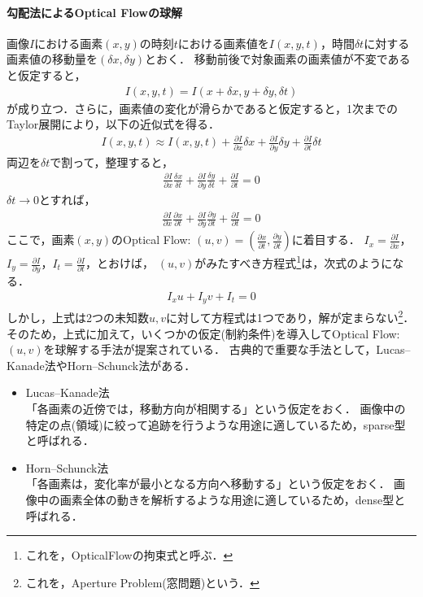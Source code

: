 \documentclass[11pt,a4j]{jarticle}
\begin{document}
      \paragraph{勾配法によるOptical Flowの球解}
      画像$I$における画素$(x,y)$の時刻$t$における画素値を$I(x,y,t)$，時間$\delta t$に対する画素値の移動量を$(\delta x, \delta y)$とおく．
      移動前後で対象画素の画素値が不変であると仮定すると，
      \begin{align}
        I(x,y,t) = I(x + \delta x, y + \delta y, \delta t)
      \end{align}
      が成り立つ．さらに，画素値の変化が滑らかであると仮定すると，1次までのTaylor展開により，以下の近似式を得る．
      \begin{align}
        I(x,y,t) \approx I(x,y,t) + \frac{\partial I}{\partial x} \delta x + \frac{\partial I}{\partial y} \delta y + \frac{\partial I}{\partial t} \delta t
      \end{align}
      両辺を$\delta t$で割って，整理すると，
      \begin{align}
        \frac{\partial I}{\partial x} \frac{\delta x}{\delta t} + \frac{\partial I}{\partial y} \frac{\delta y}{\delta t} + \frac{\partial I}{\partial t} = 0
      \end{align}
      $\delta t \to 0$とすれば，
      \begin{align}
        \frac{\partial I}{\partial x} \frac{\partial x}{\partial t} + \frac{\partial I}{\partial y} \frac{\partial y}{\partial t} + \frac{\partial I}{\partial t} = 0
      \end{align}
      ここで，画素$(x,y)$のOptical Flow: $(u,v) = \left(\frac{\partial x}{\partial t}, \frac{\partial y}{\partial t} \right)$に着目する．
      $I_x = \frac{\partial I}{\partial x}$，$I_y = \frac{\partial I}{\partial y}$，$I_t = \frac{\partial I}{\partial t}$，とおけば，
      $(u,v)$がみたすべき方程式\footnote{これを，OpticalFlowの拘束式と呼ぶ．}は，次式のようになる．
      \begin{align}
        I_x u + I_y v + I_t = 0
      \end{align}
      しかし，上式は2つの未知数$u,v$に対して方程式は1つであり，解が定まらない\footnote{これを，Aperture Problem(窓問題)という．}．
      そのため，上式に加えて，いくつかの仮定(制約条件)を導入してOptical Flow: $(u,v)$を球解する手法が提案されている．
      古典的で重要な手法として，Lucas–Kanade法やHorn–Schunck法がある．
      \begin{itemize}
        \item Lucas–Kanade法 \\
          「各画素の近傍では，移動方向が相関する」という仮定をおく．
          画像中の特定の点(領域)に絞って追跡を行うような用途に適しているため，sparse型と呼ばれる．
        \item Horn–Schunck法 \\
          「各画素は，変化率が最小となる方向へ移動する」という仮定をおく．
          画像中の画素全体の動きを解析するような用途に適しているため，dense型と呼ばれる．
      \end{itemize}
\end{document}
